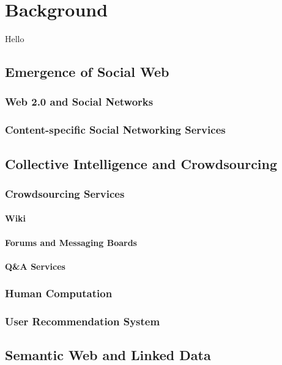 

\chapter{Background} \label{Chapter:Background}
Hello

\section{Emergence of Social Web}
\subsection{Web 2.0 and Social Networks}
\subsection{Content-specific Social Networking Services}

\section{Collective Intelligence and Crowdsourcing}

\subsection{Crowdsourcing Services}
\subsubsection{Wiki}
\subsubsection{Forums and Messaging Boards}
\subsubsection{Q\&A Services}
\subsection{Human Computation}
\subsection{User Recommendation System}

\section{Semantic Web and Linked Data}
